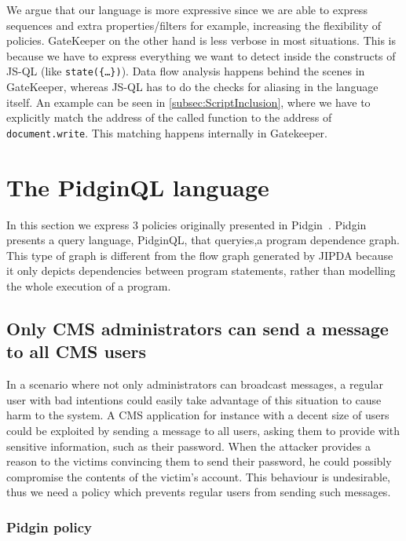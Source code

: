  We argue that our language is more expressive since we are able to express sequences and extra properties/filters for example, increasing the flexibility of policies. GateKeeper on the other hand is less verbose in most situations. This is because we have to express everything we want to detect inside the constructs of JS-QL (like \texttt{state(\{\dots\})}). Data flow analysis happens behind the scenes in GateKeeper, whereas JS-QL has to do the checks for aliasing in the language itself. An example can be seen in \ref{subsec:ScriptInclusion}, where we have to explicitly match the address of the called function to the address of \texttt{document.write}. This matching happens internally in Gatekeeper.


\section{The PidginQL language}
\label{sec:ValidationPidginQL}

In this section we express 3 policies originally presented in Pidgin~\cite{PidginQLTechReport}. Pidgin presents a query language, PidginQL, that queryies,a program dependence graph. This type of graph is different from the flow graph generated by JIPDA because it only depicts dependencies between program statements, rather than modelling the whole execution of a program. 

\subsection{Only CMS administrators can send a message to all CMS users}
\label{subsec:CMSAdmin}
In a scenario where not only administrators can broadcast messages, a regular user with bad intentions could easily take advantage of this situation to cause harm to the system. A CMS application for instance with a decent size of users could be exploited by sending a message to all users, asking them to provide with sensitive information, such as their password. When the attacker provides a reason to the victims convincing them to send their password, he could possibly compromise the contents of the victim's account. This behaviour is undesirable, thus we need a policy which prevents regular users from sending such messages.

\subsubsection*{Pidgin policy}

